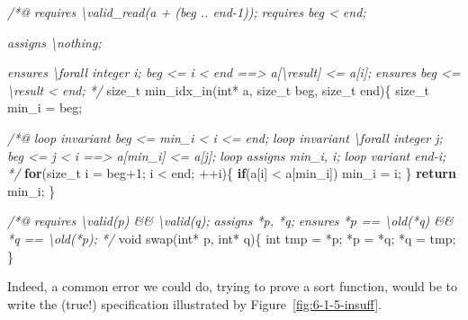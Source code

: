 \documentclass[12pt,francais,]{scrbook}
\newenvironment{Shaded}{}{}
\newcommand{\KeywordTok}[1]{\textcolor[rgb]{0.00,0.44,0.13}{\textbf{{#1}}}}
\newcommand{\DataTypeTok}[1]{\textcolor[rgb]{0.56,0.13,0.00}{{#1}}}
\newcommand{\DecValTok}[1]{\textcolor[rgb]{0.25,0.63,0.44}{{#1}}}
\newcommand{\CommentTok}[1]{\textcolor[rgb]{0.38,0.63,0.69}{\textit{{#1}}}}
\newcommand{\NormalTok}[1]{{#1}}
\newenvironment{zdssecretblock}[1]{%
  \tcolorbox[beamer,%
    noparskip,breakable,
    colback=LightGray,colframe=DarkGray,%
    colbacklower=LightGray,%
    title=#1]
}{\endtcolorbox}
\begin{document}
\begin{zdssecretblock}{Answer}
  \begin{footnotesize}
  \begin{footnotesize}\begin{Shaded}
\begin{Highlighting}[]
\CommentTok{/*@}
\CommentTok{  requires \textbackslash{}valid_read(a + (beg .. end-1));}
\CommentTok{  requires beg < end;}

\CommentTok{  assigns  \textbackslash{}nothing;}

\CommentTok{  ensures  \textbackslash{}forall integer i; beg <= i < end ==> a[\textbackslash{}result] <= a[i];}
\CommentTok{  ensures  beg <= \textbackslash{}result < end;}
\CommentTok{*/}
\NormalTok{size_t min_idx_in(}\DataTypeTok{int}\NormalTok{* a, size_t beg, size_t end)\{}
  \NormalTok{size_t min_i = beg;}

  \CommentTok{/*@}
\CommentTok{    loop invariant beg <= min_i < i <= end;}
\CommentTok{    loop invariant \textbackslash{}forall integer j; beg <= j < i ==> a[min_i] <= a[j];}
\CommentTok{    loop assigns min_i, i;}
\CommentTok{    loop variant end-i;}
\CommentTok{  */}
  \KeywordTok{for}\NormalTok{(size_t i = beg}\DecValTok{+1}\NormalTok{; i < end; ++i)\{}
    \KeywordTok{if}\NormalTok{(a[i] < a[min_i]) min_i = i;}
  \NormalTok{\}}
  \KeywordTok{return} \NormalTok{min_i;}
\NormalTok{\}}

\CommentTok{/*@}
\CommentTok{  requires \textbackslash{}valid(p) && \textbackslash{}valid(q);}
\CommentTok{  assigns  *p, *q;}
\CommentTok{  ensures  *p == \textbackslash{}old(*q) && *q == \textbackslash{}old(*p);}
\CommentTok{*/}
\DataTypeTok{void} \NormalTok{swap(}\DataTypeTok{int}\NormalTok{* p, }\DataTypeTok{int}\NormalTok{* q)\{}
  \DataTypeTok{int} \NormalTok{tmp = *p; *p = *q; *q = tmp;}
\NormalTok{\}}
\end{Highlighting}
  \end{Shaded}\end{footnotesize}
  \end{footnotesize}
\end{zdssecretblock}

Indeed, a common error we could do, trying to prove a sort function,
would be to write the (true!) specification illustrated by
Figure~\ref{fig:6-1-5-insuff}.
\end{document}
